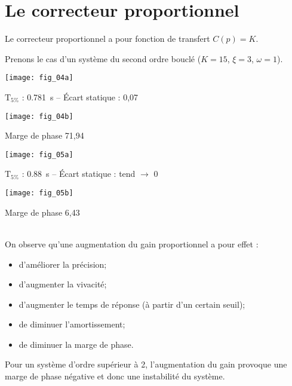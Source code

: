 \newpage

\section{Le correcteur proportionnel}

\begin{defi}

Le correcteur proportionnel a pour fonction de transfert $C(p)=K$.

\end{defi}

Prenons le cas d'un système du second ordre bouclé ($K=15$, $\xi=3$, $\omega=1$).

\noindent
\begin{minipage}[c]{.46\linewidth}
\begin{center}
\texttt{[image: fig\_04a]}

$\text{T}_{5\%}$ : \SI{0,781}{s} -- Écart statique : 0,07
\end{center}

\end{minipage} \hfill
\begin{minipage}[c]{.46\linewidth}
\begin{center}
\texttt{[image: fig\_04b]}

Marge de phase 71,94 \degres
\end{center}
\end{minipage} 


\noindent
\begin{minipage}[c]{.46\linewidth}
\begin{center}
\texttt{[image: fig\_05a]}

$\text{T}_{5\%}$ : \SI{0,88}{s} -- Écart statique : tend $\to$ 0
\end{center}

\end{minipage} \hfill
\begin{minipage}[c]{.46\linewidth}
\begin{center}
\texttt{[image: fig\_05b]}

Marge de phase 6,43 \degres
\end{center}
\end{minipage} 

\begin{resultat}
~\\
On observe qu'une augmentation du gain proportionnel a pour effet :
\begin{itemize}
\item d'améliorer la précision;
\item d'augmenter la vivacité;
\item d'augmenter le temps de réponse (à partir d'un certain seuil);
\item de diminuer l'amortissement;
\item de diminuer la marge de phase.
\end{itemize}
Pour un système d'ordre supérieur à 2, l'augmentation du gain provoque une marge de phase négative et donc une instabilité du système.
\end{resultat}

